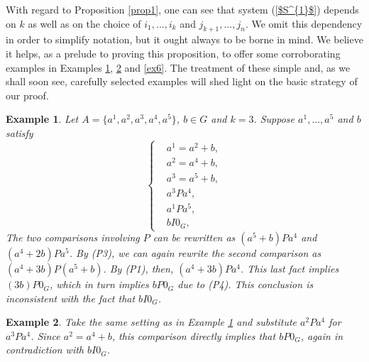 \documentclass[pdflatex,sn-apa,11pt]{sn-jnl}%
\newtheorem{example}{Example}%
\begin{document}
With regard to Proposition \ref{prop1}, one can see that system (\ref{$S^{1}$}) depends on $k$ as well as on the choice of $i_1, ..., i_k$ and $j_{k+1}, ..., j_n$. We omit this dependency in order to simplify notation, but it ought always to be borne in mind. We believe it helps, as a prelude to proving this proposition, to offer some corroborating examples in Examples \ref{ex4}, \ref{ex5} and \ref{ex6}. The treatment of these simple and, as we shall soon see, carefully selected examples will shed light on the basic strategy of our proof.  

\begin{example}
\label{ex4}
Let $A = \{a^1, a^2, a^3, a^4, a^5\}$, $b \in G$ and $k = 3$. Suppose $a^1, ..., a^5$ and $b$ satisfy
\begin{equation*}
  \left\{
    \begin{aligned}
      & a^1 = a^{2} + b, \\
      & a^2 = a^{4} + b, \\
      & a^3 = a^{5} + b, \\
      & a^{3}Pa^{4}, \\
      & a^{1}Pa^{5}, \\
      & bI{0_G},
    \end{aligned}
  \right.
\end{equation*}
The two comparisons involving $P$ can be rewritten as $(a^{5}+b)Pa^{4}$ and $(a^{4}+2b)Pa^{5}$. By (P3), we can again rewrite the second comparison as $(a^{4}+3b)P(a^{5}+b)$. By (P1), then, $(a^{4}+3b)Pa^{4}$. This last fact implies $(3b)P0_{G}$, which in turn implies $bP0_{G}$ due to (P4). This conclusion is inconsistent with the fact that $bI0_{G}$. 
\end{example}

\begin{example}
\label{ex5}
Take the same setting as in Example \ref{ex4} and substitute $a^{2}Pa^{4}$ for $a^{3}Pa^{4}$. Since $a^2 = a^4 + b$, this comparison directly implies that $bP0_{G}$, again in contradiction with $bI0_G$. 
\end{example}
\end{document}
